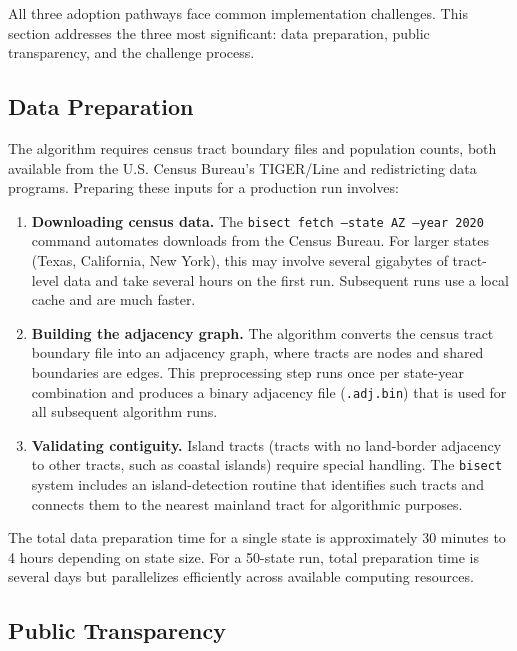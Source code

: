 \label{sec:challenges}

All three adoption pathways face common implementation challenges.  This
section addresses the three most significant: data preparation, public
transparency, and the challenge process.

\subsection{Data Preparation}

The algorithm requires census tract boundary files and population counts, both
available from the U.S. Census Bureau's TIGER/Line and redistricting data
programs.  Preparing these inputs for a production run involves:

\begin{enumerate}
  \item \textbf{Downloading census data.}  The \texttt{bisect fetch --state AZ
    --year 2020} command automates downloads from the Census Bureau.  For
    larger states (Texas, California, New York), this may involve several
    gigabytes of tract-level data and take several hours on the first run.
    Subsequent runs use a local cache and are much faster.

  \item \textbf{Building the adjacency graph.}  The algorithm converts the
    census tract boundary file into an adjacency graph, where tracts are nodes
    and shared boundaries are edges.  This preprocessing step runs once per
    state-year combination and produces a binary adjacency file (\texttt{.adj.bin})
    that is used for all subsequent algorithm runs.

  \item \textbf{Validating contiguity.}  Island tracts (tracts with no
    land-border adjacency to other tracts, such as coastal islands) require
    special handling.  The \texttt{bisect} system includes an island-detection
    routine that identifies such tracts and connects them to the nearest
    mainland tract for algorithmic purposes.
\end{enumerate}

The total data preparation time for a single state is approximately 30 minutes
to 4 hours depending on state size.  For a 50-state run, total preparation
time is several days but parallelizes efficiently across available computing
resources.

\subsection{Public Transparency}

